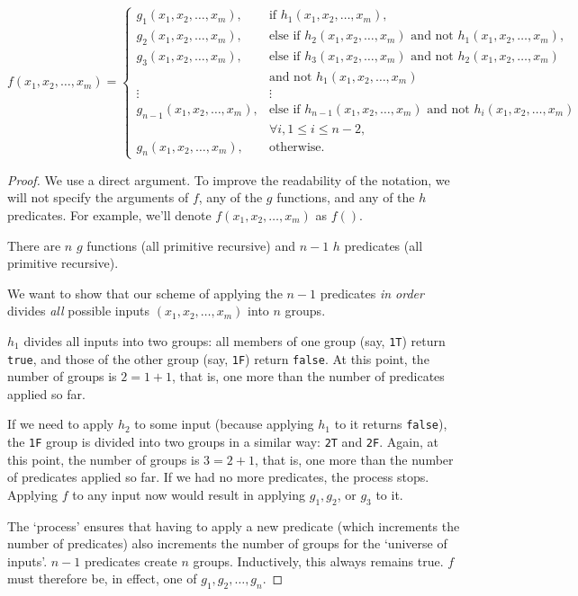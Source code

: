 \documentclass[11pt]{book}
\theoremstyle{definition}
\theoremstyle{plain}
\theoremstyle{problemstyle}
\theoremstyle{remark}
\theoremstyle{definition}
\begin{document}
    \begin{equation}
        \label{eq:n-primitive-recursive-predicates}
        f(x_1,x_2,\dots,x_m)=\begin{cases}
            g_1(x_1,x_2,\dots,x_m), & \text{if $h_1(x_1,x_2,\dots,x_m)$,}\\
            g_2(x_1,x_2,\dots,x_m), & \text{else if $h_2(x_1,x_2,\dots,x_m)$ and not $h_1(x_1,x_2,\dots,x_m)$,}\\
            g_3(x_1,x_2,\dots,x_m), & \text{else if $h_3(x_1,x_2,\dots,x_m)$ and not $h_2(x_1,x_2,\dots,x_m)$}\\
            &\text{and not $h_1(x_1,x_2,\dots,x_m)$}\\
            \vdots & \vdots\\
            g_{n-1}(x_1,x_2,\dots,x_m), & \text{else if $h_{n-1}(x_1,x_2,\dots,x_m)$ and not $h_i(x_1,x_2,\dots,x_m)$}\\
            & \forall i, 1\leq i\leq n-2,\\
            g_n(x_1,x_2,\dots,x_m), & \text{otherwise.}
		 \end{cases}
    \end{equation}

\begin{proof}

    We use a direct argument. To improve the readability of the notation, we will not specify the arguments of $f$, any of the $g$ functions, and any of the $h$ predicates. For example, we'll denote $f(x_1,x_2,\dots,x_m)$ as $f()$.

    There are $n$ $g$ functions (all primitive recursive) and $n-1$ $h$ predicates (all primitive recursive).

    We want to show that our scheme of applying the $n-1$ predicates \emph{in order} divides \emph{all} possible inputs $(x_1,x_2,\dots,x_m)$ into $n$ groups. 

    $h_1$ divides all inputs into two groups: all members of one group (say, \texttt{1T}) return \texttt{true}, and those of the other group (say, \texttt{1F}) return \texttt{false}. At this point, the number of groups is $2=1+1$, that is, one more than the number of predicates applied so far. 

    If we need to apply $h_2$ to some input (because applying $h_1$ to it returns \texttt{false}), the \texttt{1F} group is divided into two groups in a similar way: \texttt{2T} and \texttt{2F}. Again, at this point, the number of groups is $3=2+1$, that is, one more than the number of predicates applied so far. If we had no more predicates, the process stops. Applying $f$ to any input now would result in applying $g_1,g_2$, or $g_3$ to it. 

    The `process' ensures that having to apply a new predicate (which increments the number of predicates) also increments the number of groups for the `universe of inputs'. $n-1$ predicates create $n$ groups. Inductively, this always remains true. $f$ must therefore be, in effect, one of $g_1,g_2,\dots,g_n$.

\end{proof}
\end{document}
